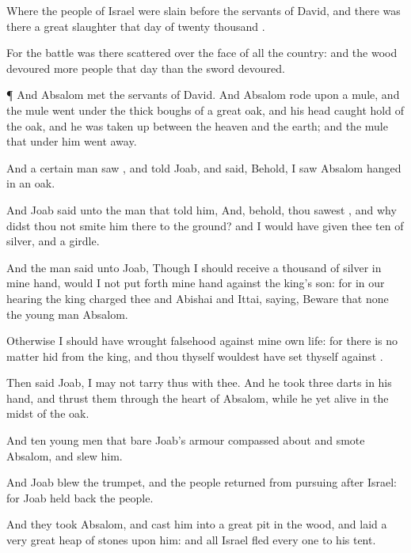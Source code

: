 {Where the
people of
Israel were
slain
before the
servants of
David, and there was there a
great
slaughter that
day of
twenty
thousand
{}.

For the
battle was there
scattered over the
face of all the
country: and the
wood
devoured
more
people that
day than the
sword
devoured.


\par }{\PP {}¶ And
Absalom
met the
servants of
David. And
Absalom
rode upon a
mule, and the
mule
went under the thick
boughs of a
great
oak, and his
head caught
hold of the
oak, and he was taken
up between the
heaven and the
earth; and the
mule that
{} under him went
away.

And a
certain
man
saw
{}, and
told
Joab, and
said, Behold, I
saw
Absalom
hanged in an
oak.

And
Joab
said unto the
man that
told him, And, behold, thou
sawest
{}, and why didst thou not
smite him there to the
ground? and I would have
given thee
ten
{} of
silver, and
a
girdle.

And the
man
said unto
Joab,
Though I should
receive a
thousand
{} of
silver in mine
hand,
{} would I not put
forth mine
hand against the
king’s
son: for in our
hearing the
king
charged thee and
Abishai and
Ittai,
saying,
Beware that none
{} the young
man
Absalom.

Otherwise I should have
wrought
falsehood against mine own
life: for there is no
matter
hid from the
king, and thou thyself wouldest have
set thyself against
{}.

Then
said
Joab, I may not
tarry thus with
thee. And he
took
three
darts in his
hand, and
thrust them through the
heart of
Absalom, while he
{} yet
alive in the midst of the
oak.

And
ten young
men that
bare
Joab’s
armour compassed
about and
smote
Absalom, and
slew him.

And
Joab
blew the
trumpet, and the
people
returned from
pursuing
after
Israel: for
Joab held
back the
people.

And they
took
Absalom, and
cast him into a
great
pit in the
wood, and
laid a
very
great
heap of
stones upon him: and all
Israel
fled every
one to his
tent.


}
